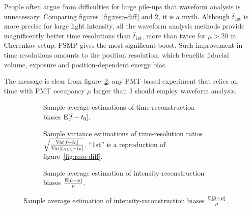 People often argue from difficulties for large pile-ups that waveform analysis is unnecessary.  Comparing figures~\ref{fig:reso-diff} and \ref{fig:deltamethods}, it is a myth.  Although $\hat{t}_\mathrm{1st}$ is more precise for large light intensity, all the waveform analysis methods provide magnificently better time resolutions than $\hat{t}_\mathrm{1st}$, more than twice for $\mu>20$ in Cherenkov setup.  FSMP gives the most significant boost.  Such improvement in time resolutions amounts to the position resolution, which benefits fiducial volume, exposure and position-dependent energy bias.

The message is clear from figure~\ref{fig:deltamethods}: any PMT-based experiment that relies on time with PMT occupancy $\mu$ larger than 3 should employ waveform analysis.

\begin{figure}[H]
  \begin{subfigure}[b]{\textwidth}
    \centering
    \resizebox{0.99\textwidth}{!}{}
    \vspace{-0.5em}
    \caption{\label{fig:biasmethods} Sample average estimations of time-reconstruction biases $\operatorname{E}[\hat{t} - t_0]$.}
  \end{subfigure}

  \vspace{0.5em}
  \begin{subfigure}[b]{\textwidth}
    \centering
    \resizebox{0.99\textwidth}{!}{}
    \vspace{-0.5em}
    \caption{\label{fig:deltamethods} Sample variance estimations of time-resolution ratios $\sqrt{\frac{\operatorname{Var}[\hat{t} - t_0]}{\operatorname{Var}[\hat{t}_\mathrm{ALL} - t_0]}}$. ``1st'' is a reproduction of figure~\ref{fig:reso-diff}.}
  \end{subfigure}

  \vspace{0.5em}
  \begin{subfigure}[b]{\textwidth}
    \centering
    \resizebox{0.99\textwidth}{!}{}
    \vspace{-0.5em}
    \caption{\label{fig:biasmu} Sample average estimation of intensity-reconstruction biases $\frac{\operatorname{E}[\hat{\mu} - \mu]}{\mu}$.}
  \end{subfigure}


\end{figure}
